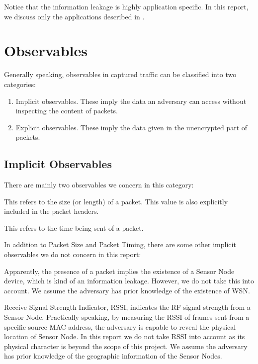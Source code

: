 Notice that the information leakage is highly application specific. In this report, we discuss only the applications described in . 

\section{Observables}

Generally speaking, observables in captured traffic can be classified into two categories:
\begin{enumerate}
	\item Implicit observables. These imply the data an adversary can access without inspecting the content of packets.
	\item Explicit observables. These imply the data given in the unencrypted part of packets.
\end{enumerate}

\subsection{Implicit Observables}

There are mainly two observables we concern in this category:

\begin{description}[style=nextline]
	\item[Packet Size] 
	This refers to the size (or length) of a packet. This value is also explicitly included in the packet headers.
	
	\item[Packet Timing]
	This refers to the time being sent of a packet. 
\end{description}

In addition to Packet Size and Packet Timing, there are some other implicit observables we do not concern in this report:

\begin{description}[style=nextline]
	\item[Presence of Packets]
	Apparently, the presence of a packet implies the existence of a Sensor Node device, which is kind of an information leakage. However, we do not take this into account. We assume the adversary has prior knowledge of the existence of WSN.
	
	\item[RSSI]
	Receive Signal Strength Indicator, RSSI, indicates the RF signal strength from a Sensor Node. Practically speaking, by measuring the RSSI of frames sent from a specific source MAC address, the adversary is capable to reveal the physical location of Sensor Node. In this report we do not take RSSI into account as its physical character is beyond the scope of this project. We assume the adversary has prior knowledge of the geographic information of the Sensor Nodes.
\end{description}

